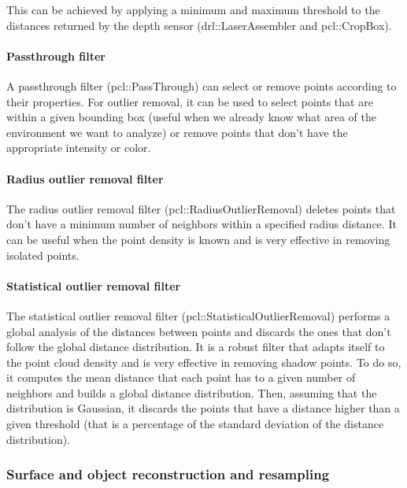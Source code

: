 This can be achieved by applying a minimum and maximum threshold to the distances returned by the depth sensor (drl::LaserAssembler and pcl::CropBox).


\paragraph{Passthrough filter}

A passthrough filter (pcl::PassThrough) can select or remove points according to their properties. For outlier removal, it can be used to select points that are within a given bounding box (useful when we already know what area of the environment we want to analyze) or remove points that don't have the appropriate intensity or color.


\paragraph{Radius outlier removal filter}

The radius outlier removal filter (pcl::RadiusOutlierRemoval) deletes points that don't have a minimum number of neighbors within a specified radius distance. It can be useful when the point density is known and is very effective in removing isolated points.


\paragraph{Statistical outlier removal filter}

The statistical outlier removal filter (pcl::StatisticalOutlierRemoval) \cite{Rusu2010a} performs a global analysis of the distances between points and discards the ones that don't follow the global distance distribution. It is a robust filter that adapts itself to the point cloud density and is very effective in removing shadow points. To do so, it computes the mean distance that each point has to a given number of neighbors and builds a global distance distribution. Then, assuming that the distribution is Gaussian, it discards the points that have a distance higher than a given threshold (that is a percentage of the standard deviation of the distance distribution).


\subsubsection{Surface and object reconstruction and resampling}\label{subsec:localization_system_surface-reconstruction-resampling}


